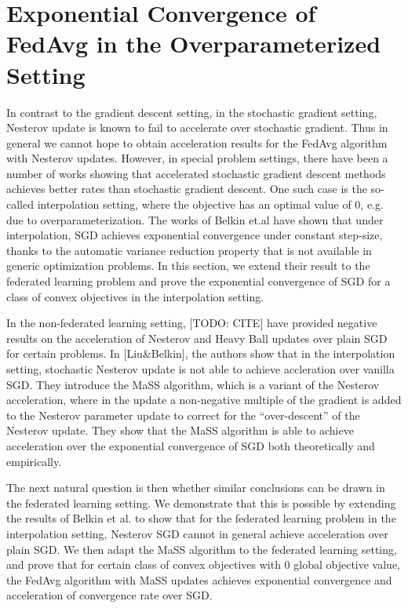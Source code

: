 


\section{Exponential Convergence of FedAvg in the Overparameterized Setting}

In contrast to the gradient descent setting, in the stochastic gradient
setting, Nesterov update is known to fail to accelerate over stochastic
gradient. Thus in general we cannot hope to obtain acceleration results
for the FedAvg algorithm with Nesterov updates. However, in special
problem settings, there have been a number of works showing that accelerated
stochastic gradient descent methods achieves better rates than stochastic
gradient descent. One such case is the so-called interpolation setting,
where the objective has an optimal value of 0, e.g. due to overparameterization.
The works of Belkin et.al have shown that under interpolation, SGD
achieves exponential convergence under constant step-size, thanks
to the automatic variance reduction property that is not available
in generic optimization problems. In this section, we extend their
result to the federated learning problem and prove the exponential
convergence of SGD for a class of convex objectives in the interpolation
setting.

In the non-federated learning setting, {[}TODO: CITE{]} have provided
negative results on the acceleration of Nesterov and Heavy Ball updates
over plain SGD for certain problems. In {[}Liu\&Belkin{]}, the authors
show that in the interpolation setting, stochastic Nesterov update
is not able to achieve accleration over vanilla SGD. They introduce
the MaSS algorithm, which is a variant of the Nesterov acceleration,
where in the update a non-negative multiple of the gradient is added
to the Nesterov parameter update to correct for the ``over-descent''
of the Nesterov update. They show that the MaSS algorithm is able
to achieve acceleration over the exponential convergence of SGD both
theoretically and empirically.

The next natural question is then whether similar conclusions can
be drawn in the federated learning setting. We demonstrate that this
is possible by extending the results of Belkin et al. to show that
for the federated learning problem in the interpolation setting, Nesterov
SGD cannot in general achieve acceleration over plain SGD. We then
adapt the MaSS algorithm to the federated learning setting, and prove
that for certain class of convex objectives with 0 global objective
value, the FedAvg algorithm with MaSS updates achieves exponential
convergence and acceleration of convergence rate over SGD. 

